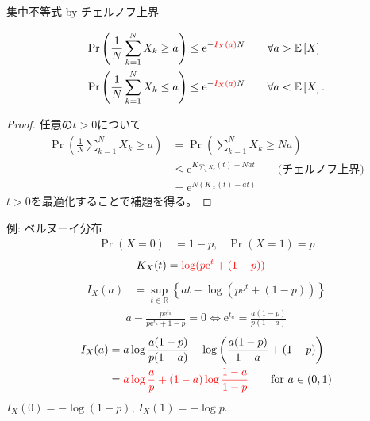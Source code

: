 \documentclass[lualatex,handout]{beamer}
\newcommand{\emm}[1]{\textcolor{red}{#1}}
\newcommand{\expt}[1]{\mathbb{E}\left[#1\right]}
\theoremstyle{definition}
\begin{document}
\begin{frame}{集中不等式 by チェルノフ上界}
\small
\begin{theorem}[集中不等式]
\vspace{-1em}
\begin{align*}
\Pr\left(\frac1N\sum_{k=1}^N X_k\ge a\right) &\le \mathrm{e}^{-\emm{I_X(a)}N}\qquad\forall a>\expt{X}\\
\Pr\left(\frac1N\sum_{k=1}^N X_k\le a\right) &\le \mathrm{e}^{-\emm{I_X(a)}N}\qquad\forall a<\expt{X}.
\end{align*}
\end{theorem}
\begin{proof}
任意の$t>0$について
\begin{align*}
\Pr\left(\frac1N\sum_{k=1}^N X_k\ge a\right) &=
\Pr\left(\sum_{k=1}^N X_k\ge Na\right)\\
&\le\mathrm{e}^{K_{\sum_k X_k}(t) - Nat}\qquad\text{(チェルノフ上界)}\\
&=\mathrm{e}^{N(K_X(t) - at)}
\end{align*}
$t>0$を最適化することで補題を得る。
\end{proof}
\end{frame}



\begin{frame}{例: ベルヌーイ分布}
\begin{align*}
\Pr(X=0) &= 1-p,&\Pr(X=1)=p
\end{align*}
\begin{align*}
K_X(t) &= \emm{\log(p\mathrm{e}^t + (1-p))}
\end{align*}
\begin{align*}
I_X(a) &= \sup_{t\in\mathbb{R}} \left\{ at - \log(p\mathrm{e}^t+(1-p))\right\}
\end{align*}
\begin{align*}
a - \frac{p\mathrm{e}^{t_a}}{p\mathrm{e}^{t_a}+1-p} = 0
\iff \mathrm{e}^{t_a} = \frac{a(1-p)}{p(1-a)}
\end{align*}
\begin{align*}
I_X(a) &= a\log\frac{a(1-p)}{p(1-a)} - \log\left(\frac{a(1-p)}{1-a} + (1-p)\right)\\
 &= \emm{a\log\frac{a}{p} + (1-a)\log\frac{1-a}{1-p}} \qquad\text{for } a\in(0,1)
\end{align*}
$I_X(0) = -\log(1-p)$, $I_X(1) = -\log p$.
\end{frame}
\end{document}
